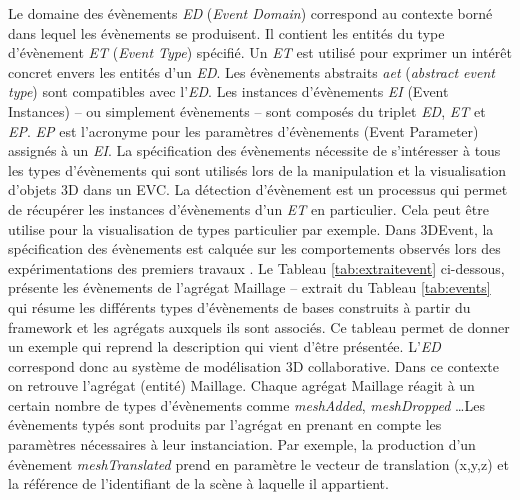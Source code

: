 Le domaine des évènements \textit{ED} (\textit{Event Domain}) correspond au 
contexte borné dans 
lequel les évènements se produisent. 
Il contient les entités du type d'évènement 
\textit{ET} (\textit{Event Type}) spécifié. Un \textit{ET} est utilisé pour exprimer un 
intérêt concret envers les entités d'un \textit{ED}. Les évènements abstraits 
\textit{aet} (\textit{abstract event type}) sont compatibles avec l'\textit{ED}. Les 
instances d'évènements \textit{EI} (Event Instances) -- ou simplement 
évènements -- sont composés du triplet \textit{ED}, \textit{ET} et \textit{EP}. 
\textit{EP} est l'acronyme pour les paramètres d'évènements (Event Parameter) 
assignés à un \textit{EI}. La spécification des évènements nécessite de 
s'intéresser à tous les types d'évènements qui sont utilisés lors de la manipulation 
et la visualisation d'objets 3D dans un \gls{EVC}. La détection d'évènement est un 
processus qui permet de récupérer les instances d'évènements d'un \textit{ET} en 
particulier. Cela peut être utilise pour la visualisation de types particulier par 
exemple. Dans 3DEvent, la spécification des évènements est calquée sur les 
comportements observés lors des expérimentations des premiers travaux 
\cite{Desprat2015a, Desprat2015b}. Le Tableau \ref{tab:extraitevent} ci-dessous, 
présente les évènements de l'agrégat Maillage -- extrait du Tableau 
\ref{tab:events} qui résume les 
différents types d'évènements de bases construits à partir du framework et les 
agrégats auxquels ils sont associés. 
Ce tableau permet de donner un exemple qui reprend la description qui vient d'être 
présentée. L'\textit{ED} correspond donc au \og système de modélisation 3D 
collaborative\fg{}. 
Dans ce contexte on retrouve l'agrégat (entité) \og Maillage\fg{}. Chaque agrégat 
Maillage 
réagit à un certain nombre de types d'évènements comme \textit{meshAdded}, 
\textit{meshDropped} \dots Les évènements typés sont produits par l'agrégat en 
prenant en compte les paramètres nécessaires à leur instanciation. Par exemple, 
la production d'un évènement \textit{meshTranslated} prend en paramètre le 
vecteur de translation (x,y,z) et la référence de l'identifiant de la scène à laquelle il 
appartient.

